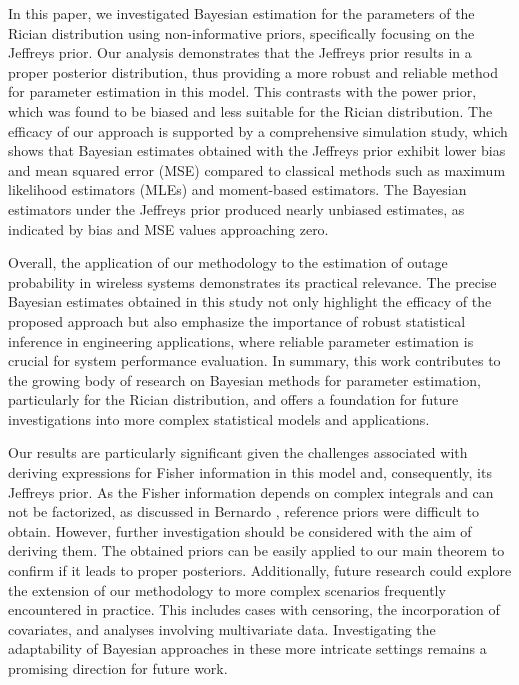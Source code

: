 \documentclass[12pt]{interact}
\theoremstyle{plain}%
\theoremstyle{definition}
\theoremstyle{remark}
\begin{document}
In this paper, we investigated Bayesian estimation for the parameters of the Rician distribution using non-informative priors, specifically focusing on the Jeffreys prior. Our analysis demonstrates that the Jeffreys prior results in a proper posterior distribution, thus providing a more robust and reliable method for parameter estimation in this model. This contrasts with the power prior, which was found to be biased and less suitable for the Rician distribution. The efficacy of our approach is supported by a comprehensive simulation study, which shows that Bayesian estimates obtained with the Jeffreys prior exhibit lower bias and mean squared error (MSE) compared to classical methods such as maximum likelihood estimators (MLEs) and moment-based estimators. The Bayesian estimators under the Jeffreys prior produced nearly unbiased estimates, as indicated by bias and MSE values approaching zero.

Overall, the application of our methodology to the estimation of outage probability in wireless systems demonstrates its practical relevance. The precise Bayesian estimates obtained in this study not only highlight the efficacy of the proposed approach but also emphasize the importance of robust statistical inference in engineering applications, where reliable parameter estimation is crucial for system performance evaluation. In summary, this work contributes to the growing body of research on Bayesian methods for parameter estimation, particularly for the Rician distribution, and offers a foundation for future investigations into more complex statistical models and applications.


Our results are particularly significant given the challenges associated with deriving expressions for Fisher information in this model and, consequently, its Jeffreys prior. As the Fisher information depends on complex integrals and can not be factorized, as discussed in Bernardo \cite{bernardo2005}, reference priors were difficult to obtain. However, further investigation should be considered with the aim of deriving them. The obtained priors can be easily applied to our main theorem to confirm if it leads to proper posteriors. Additionally, future research could explore the extension of our methodology to more complex scenarios frequently encountered in practice. This includes cases with censoring, the incorporation of covariates, and analyses involving multivariate data. Investigating the adaptability of Bayesian approaches in these more intricate settings remains a promising direction for future work.
\end{document}
